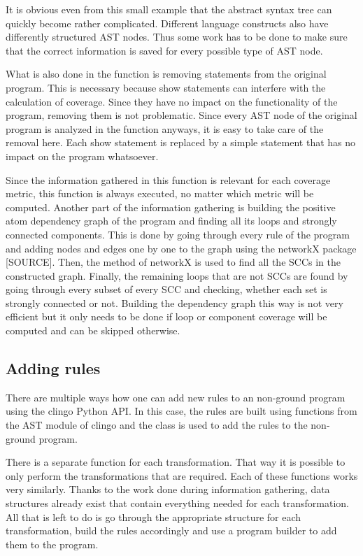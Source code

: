 It is obvious even from this small example that the abstract syntax tree can quickly become rather complicated. Different language constructs also have differently structured AST nodes.
Thus some work has to be done to make sure that the correct information is saved for every possible type of AST node.

What is also done in the  function is removing  statements from the original program. This is necessary because show statements can interfere with the calculation of coverage. Since they have no impact on the functionality of the program, removing them is not problematic. Since every AST node of the original program is analyzed in the  function anyways, it is easy to take care of the removal here. Each show statement is replaced by a simple  statement that has no impact on the program whatsoever.

Since the information gathered in this function is relevant for each coverage metric, this function is always executed, no matter which metric will be computed. Another part of the information gathering is building the positive atom dependency graph of the program and finding all its loops and strongly connected components. This is done by going through every rule of the program and adding nodes and edges one by one to the graph using the networkX package [SOURCE]. Then, the  method of networkX is used to find all the SCCs in the constructed graph. Finally, the remaining loops that are not SCCs are found by going through every subset of every SCC and checking, whether each set is strongly connected or not. Building the dependency graph this way is not very efficient but it only needs to be done if loop or component coverage will be computed and can be skipped otherwise.

\subsection{Adding rules}
\label{subsec:Computing coverage metrics for propositional programs/Implementation details/Adding rules}
There are multiple ways how one can add new rules to an non-ground program using the clingo Python API. In this case, the rules are built using functions from the AST module of clingo and the  class is used to add the rules to the non-ground program. 

There is a separate function for each transformation. That way it is possible to only perform the transformations that are required. Each of these functions works very similarly. Thanks to the work done during information gathering, data structures already exist that contain everything needed for each transformation. All that is left to do is go through the appropriate structure for each transformation, build the rules accordingly and use a program builder to add them to the program.

